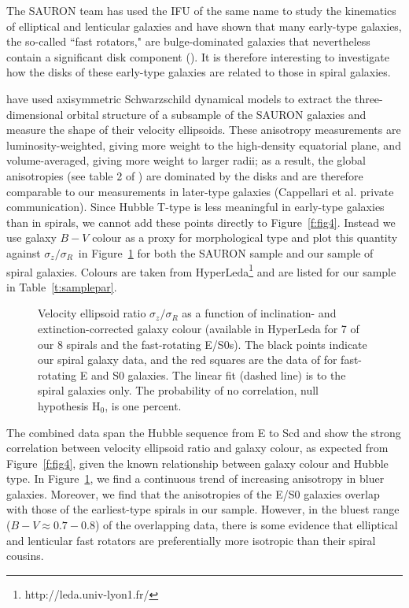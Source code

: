 \documentclass[useAMS,usenatbib]{mn2e}
\newcommand{\szsr}{$\sigma_z/\sigma_R$}
\begin{document}
The SAURON team has used the IFU of the same name to study the
kinematics of elliptical and lenticular galaxies and have shown that
many early-type galaxies, the so-called ``fast rotators," are
bulge-dominated galaxies that nevertheless contain a significant disk
component (\citealt{sauronVI, sauronXII}).  It is therefore interesting
to investigate how the disks of these early-type galaxies are related to
those in spiral galaxies.

\citet{sauronX} have used axisymmetric Schwarzschild dynamical models to
extract the three-dimensional orbital structure of a subsample of the
SAURON galaxies and measure the shape of their velocity ellipsoids.
These anisotropy measurements are luminosity-weighted, giving more
weight to the high-density equatorial plane, and volume-averaged, giving
more weight to larger radii; as a result, the global anisotropies (see
table 2 of \citealt{sauronX}) are dominated by the disks and are
therefore comparable to our measurements in later-type galaxies
(Cappellari et al. private communication).  Since Hubble T-type is less
meaningful in early-type galaxies than in spirals, we cannot add these
points directly to Figure~\ref{f:fig4}. Instead we use galaxy $B-V$
colour as a proxy for morphological type and plot this quantity against
\szsr\ in Figure~\ref{f:fig5} for both the SAURON sample and our sample
of spiral galaxies.  Colours are taken from
HyperLeda\footnote{http://leda.univ-lyon1.fr/} and are listed for our
sample in Table~\ref{t:samplepar}.

\begin{figure}
    \centerline{}
   \caption{Velocity ellipsoid ratio $\sigma_z/\sigma_R$ as a function
     of inclination- and extinction-corrected galaxy colour (available
     in HyperLeda for 7 of our 8 spirals and the fast-rotating E/S0s).
     The black points indicate our spiral galaxy data, and the red
     squares are the data of \citet{sauronX} for fast-rotating E and S0
     galaxies. The linear fit (dashed line) is to the spiral galaxies
     only. The probability of no correlation, null hypothesis H$_0$, is
     one percent.
   \label{f:fig5}}
\end{figure}

The combined data span the Hubble sequence from E to Scd and show the
strong correlation between velocity ellipsoid ratio and galaxy colour,
as expected from Figure~\ref{f:fig4}, given the known relationship
between galaxy colour and Hubble type.  In Figure~\ref{f:fig5}, we find
a continuous trend of increasing anisotropy in bluer galaxies.
Moreover, we find that the anisotropies of the E/S0 galaxies overlap
with those of the earliest-type spirals in our sample.  However, in the
bluest range ($B-V \approx 0.7-0.8$) of the overlapping data, there is
some evidence that elliptical and lenticular fast rotators are
preferentially more isotropic than their spiral cousins.
\end{document}
